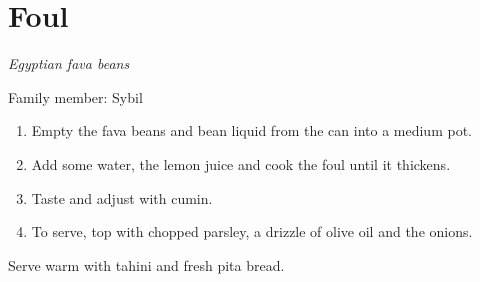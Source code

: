 \chapter{Foul}
\label{ch:foul}


\textit{Egyptian fava beans}

Family member: Sybil

\begin{enumerate}
    \item Empty the fava beans and bean liquid from the can into a medium pot.
    \item Add some water, the lemon juice and cook the foul until it thickens.
    \item Taste and adjust with cumin.
    \item To serve, top with chopped parsley, a drizzle of olive oil and the onions.
\end{enumerate}

Serve warm with tahini and fresh pita bread.
